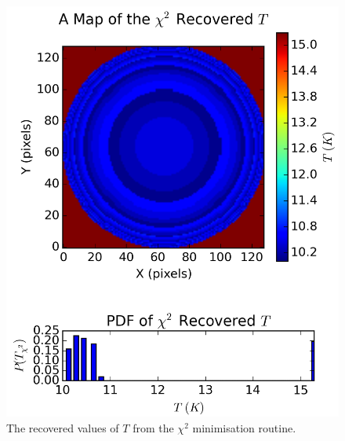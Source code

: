 \documentclass{report}
\begin{document}
\begin{figure}[H]
{\begin{minipage}[b]{0.34\linewidth}
    \includegraphics[width=\linewidth]{../img/sim/map_T_chi.png}
    \caption{\protect The recovered values of $T$ from the $\chi^{2}$ minimisation routine.}\label{fig:map_T_chi}
    \vspace{1.5ex}
  \end{minipage}%
  \begin{minipage}[b]{0.34\linewidth}
    \centering
    \hspace{5.5ex}

\end{minipage}}
\end{figure}
\end{document}
